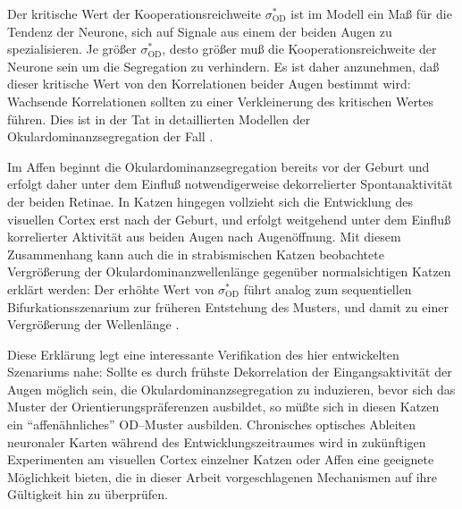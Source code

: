 Der kritische Wert der Kooperationsreichweite $\sigma^\ast_{\text{OD}}$ ist
im Modell ein Maß für die Tendenz der Neurone, sich auf Signale aus einem
der beiden Augen zu spezialisieren. Je größer $\sigma^\ast_{\text{OD}}$,
desto größer muß die Kooperationsreichweite der Neurone sein um die
Segregation zu verhindern. Es ist daher anzunehmen, daß dieser kritische
Wert von den Korrelationen beider Augen bestimmt wird: Wachsende
Korrelationen sollten zu einer Verkleinerung des kritischen Wertes führen.
Dies ist in der Tat in detaillierten Modellen der Okulardominanzsegregation
der Fall \cite{scherf:1994}.

Im Affen beginnt die Okulardominanzsegregation bereits vor der Geburt
\cite{rakic:1981} und erfolgt daher unter dem Einfluß
notwendigerweise dekorrelierter Spontanaktivität der beiden Retinae.  In
Katzen hingegen vollzieht sich die Entwicklung des visuellen Cortex erst
nach der Geburt, und erfolgt weitgehend unter dem Einfluß korrelierter
Aktivität aus beiden Augen nach Augenöffnung.  Mit diesem Zusammenhang
kann auch die in strabismischen Katzen beobachtete Vergrößerung der
Okulardominanzwellenlänge gegenüber normalsichtigen Katzen erklärt
werden: Der erhöhte Wert von $\sigma^\ast_{\text{OD}}$ führt analog zum
sequentiellen Bifurkationsszenarium zur früheren Entstehung des Musters,
und damit zu einer Vergrößerung der Wellenlänge
\parencite[siehe auch][]{scherf:1994}.

Diese Erklärung legt eine interessante Verifikation des hier entwickelten
Szenariums nahe: Sollte es durch frühste Dekorrelation der Eingangsaktivität
der Augen möglich sein, die Okulardominanzsegregation zu induzieren, bevor
sich das Muster der Orientierungspräferenzen ausbildet, so müßte sich in
diesen Katzen ein ``affenähnliches'' OD--Muster ausbilden.  Chronisches
optisches Ableiten neuronaler Karten während des Entwicklungszeitraumes
wird in zukünftigen Experimenten am visuellen Cortex einzelner Katzen oder
Affen eine geeignete Möglichkeit bieten, die in dieser Arbeit
vorgeschlagenen Mechanismen auf ihre Gültigkeit hin zu überprüfen.

\nocite{hoffsuemmer95a,hoffsuemmer96}

